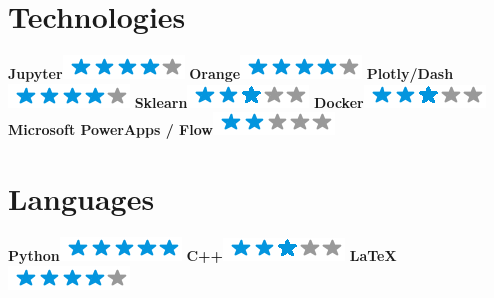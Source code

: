\documentclass[]{friggeri-cv}
\begin{document}
\begin{aside}
  \section{Technologies}
	\textbf{Jupyter}\includegraphics[scale=0.40]{img/4stars.png}
	\textbf{Orange}\includegraphics[scale=0.40]{img/4stars.png}
	\textbf{Plotly/Dash}\includegraphics[scale=0.40]{img/4stars.png}
	\textbf{Sklearn}\includegraphics[scale=0.40]{img/3stars.png}
	\textbf{Docker}\includegraphics[scale=0.40]{img/3stars.png}
	\textbf{Microsoft PowerApps / Flow}\includegraphics[scale=0.40]{img/2stars.png}
	~
  \section{Languages}
	\textbf{Python}\includegraphics[scale=0.40]{img/5stars.png}
	\textbf{C++}\includegraphics[scale=0.4]{img/3stars.png}
	\textbf{\LaTeX}\includegraphics[scale=0.4]{img/4stars.png}
	~ 
	~

\end{aside}
\end{document}
